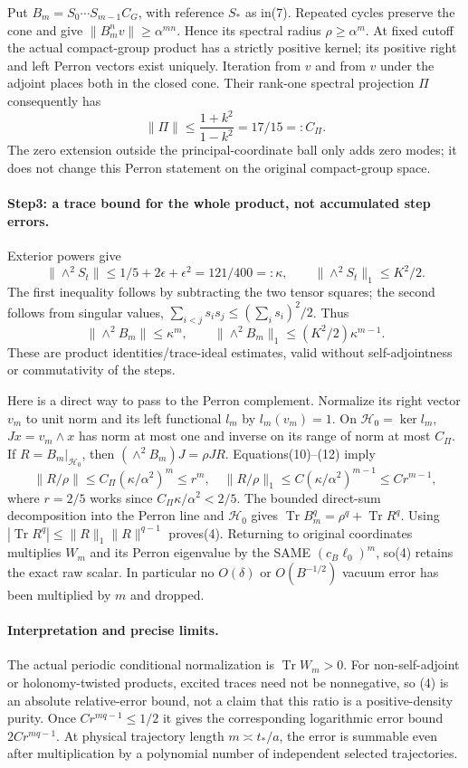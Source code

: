 \documentclass[11pt]{article}
\newcommand{\Tr}{\operatorname{Tr}}
\begin{document}
Put $B_m=S_0\cdots S_{m-1}C_G$, with reference $S_*$ as in(7).
Repeated cycles preserve the cone and give
$\|B_m^n v\|\ge\alpha^{mn}$. Hence its spectral radius $\rho\ge\alpha^m$.
At fixed cutoff the actual compact-group product has a strictly positive kernel;
its positive right and left Perron vectors exist uniquely. Iteration from $v$
and from $v$ under the adjoint places both in the closed cone. Their rank-one
spectral projection $\Pi$ consequently has
\[
 \|\Pi\|\le\frac{1+k^2}{1-k^2}=17/15=:C_\Pi.        \tag{10}
\]
The zero extension outside the principal-coordinate ball only adds zero modes;
it does not change this Perron statement on the original compact-group space.

\paragraph{Step3: a trace bound for the whole product, not accumulated step errors.}
Exterior powers give
\[
 \|\wedge^2S_t\|\le1/5+2\epsilon+\epsilon^2=121/400=:\kappa,
 \qquad \|\wedge^2S_t\|_1\le K^2/2.                  \tag{11}
\]
The first inequality follows by subtracting the two tensor squares; the second
follows from singular values, $\sum_{i<j}s_is_j\le(\sum_i s_i)^2/2$.
Thus
\[
 \|\wedge^2 B_m\|\le\kappa^m,\qquad
 \|\wedge^2 B_m\|_1\le(K^2/2)\kappa^{m-1}.           \tag{12}
\]
These are product identities/trace-ideal estimates, valid without self-adjointness
or commutativity of the steps.

Here is a direct way to pass to the Perron complement. Normalize its right vector
$v_m$ to unit norm and its left functional $l_m$ by $l_m(v_m)=1$.
On $\mathcal H_0=\ker l_m$, $Jx=v_m\wedge x$ has norm at most one and inverse
on its range of norm at most $C_\Pi$. If $R=B_m|_{\mathcal H_0}$, then
$(\wedge^2B_m)J=\rho J R$. Equations(10)--(12) imply
\[
 \|R/\rho\|\le C_\Pi(\kappa/\alpha^2)^m\le r^m,
 \quad
 \|R/\rho\|_1\le C(\kappa/\alpha^2)^{m-1}\le Cr^{m-1},  \tag{13}
\]
where $r=2/5$ works since
$C_\Pi\kappa/\alpha^2<2/5$.
The bounded direct-sum decomposition into the Perron line and $\mathcal H_0$
gives $\Tr B_m^q=\rho^q+\Tr R^q$.
Using $|\Tr R^q|\le\|R\|_1\|R\|^{q-1}$ proves(4).
Returning to original coordinates multiplies $W_m$ and its Perron eigenvalue by
the SAME $(c_B\ell_0)^m$, so(4) retains the exact raw scalar. In particular no
$O(\delta)$ or $O(B^{-1/2})$ vacuum error has been multiplied by $m$ and dropped.

\paragraph{Interpretation and precise limits.}
The actual periodic conditional normalization is $\Tr W_m>0$.
For non-self-adjoint or holonomy-twisted products, excited traces need not be
nonnegative, so (4) is an absolute relative-error bound, not a claim that this
ratio is a positive-density purity. Once $Cr^{mq-1}\le1/2$ it gives the
corresponding logarithmic error bound $2Cr^{mq-1}$.
At physical trajectory length $m\asymp t_*/a$, the error is summable even after
multiplication by a polynomial number of independent selected trajectories.
\end{document}
